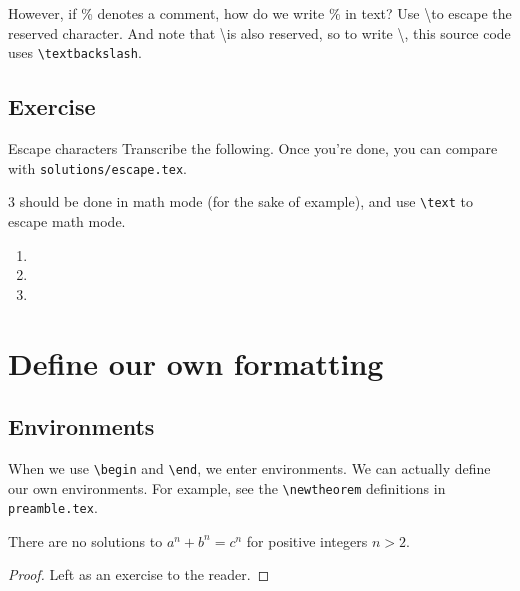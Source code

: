 \documentclass{article}
\begin{document}
However, if \% denotes a comment, how do we write \% in text? Use \textbackslash to escape the reserved character. And note that \textbackslash is also reserved, so to write \textbackslash, this source code uses \texttt{\textbackslash textbackslash}.

\subsection{Exercise}

\begin{exercise}{Escape characters}{}
    Transcribe the following. Once you're done, you can compare with \texttt{solutions/escape.tex}.

    

    3 should be done in math mode (for the sake of example), and use \texttt{\textbackslash text} to escape math mode.
    
\end{exercise}

\begin{solution}{}{}
    \begin{enumerate}
        \item 
        \item 
        \item 
    \end{enumerate}
\end{solution}

\section{Define our own formatting}

\subsection{Environments}


When we use \texttt{\textbackslash begin} and \texttt{\textbackslash end}, we enter environments. We can actually define our own environments. For example, see the \texttt{\textbackslash newtheorem} definitions in \texttt{preamble.tex}.

\begin{theorem}
    There are no solutions to $a^n+b^n=c^n$ for positive integers $n > 2$.
\end{theorem}

\begin{proof}
    Left as an exercise to the reader.
\end{proof}
\end{document}

